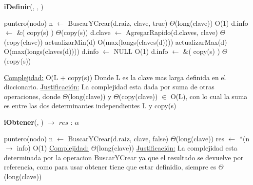 \begin{algorithm}[H]{\textbf{iDefinir}(, , )}
	\begin{algorithmic}[1]

		\State puntero(nodo) n $\gets$ BuscarYCrear(d.raiz, clave, true)     \Comment $\Theta$(long(clave))
		 													\Comment O(1)
			\State d.info $\gets$ \&( copy(s)	)					\Comment $\Theta$(copy(s))
			\State d.clave $\gets$ AgregarRapido(d.claves, clave)			\Comment $\Theta$(copy(clave))
			\State actualizarMin(d)		\Comment O(max(longs(claves(d))))
			\State actualizarMax(d)		\Comment O(max(longs(claves(d))))
		\Else
			\State d.info $\gets$ NULL							\Comment O(1)
			\State d.info $\gets$ \&( copy(s)	)					\Comment $\Theta$(copy(s))
		\EndIf

		\medskip
		\Statex \underline{Complejidad:} O(L + copy(s)) Donde L es la clave mas larga definida en el diccionario.
		\Statex \underline{Justificación:} La complejidad esta dada por suma de otras operaciones, donde 
		$\Theta$(long(clave)) y $\Theta$(copy(clave)) $\in$ O(L), con lo cual la suma es entre las dos determinantes independientes L y copy(s) 
    \end{algorithmic}
\end{algorithm}



\begin{algorithm}[H]{\textbf{iObtener}(, ) $\to$ $res$ : $\alpha$}
	\begin{algorithmic}[1]
		\State puntero(nodo) n $\gets$ BuscarYCrear(d.raiz, clave, false)     \Comment $\Theta$(long(clave))
		\State res $\gets$ *(n $\rightarrow$ info)									    \Comment O(1)
		\medskip
		\Statex \underline{Complejidad:} $\Theta$(long(clave))
		\Statex \underline{Justificación:} La complejidad esta determinada por la operacion BuscarYCrear ya que el resultado se devuelve por referencia, como para usar obtener tiene que estar definidio, siempre es $\Theta$(long(clave))
    \end{algorithmic}
\end{algorithm}


